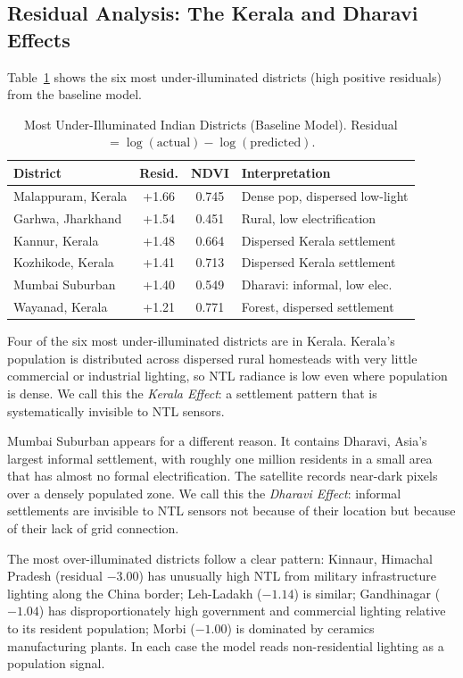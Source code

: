 \documentclass[conference]{IEEEtran}
\begin{document}
\subsection{Residual Analysis: The Kerala and Dharavi Effects}

Table~\ref{tab:residuals} shows the six most under-illuminated districts (high positive residuals) from the baseline model.

\begin{table}[!t]
\caption{Most Under-Illuminated Indian Districts (Baseline Model). Residual $= \log(\text{actual}) - \log(\text{predicted})$.}
\label{tab:residuals}
\centering
\renewcommand{\arraystretch}{1.2}
\begin{tabular}{lccp{2.8cm}}
\toprule
\textbf{District} & \textbf{Resid.} & \textbf{NDVI} & \textbf{Interpretation} \\
\midrule
Malappuram, Kerala  & +1.66 & 0.745 & Dense pop, dispersed low-light \\
Garhwa, Jharkhand   & +1.54 & 0.451 & Rural, low electrification \\
Kannur, Kerala      & +1.48 & 0.664 & Dispersed Kerala settlement \\
Kozhikode, Kerala   & +1.41 & 0.713 & Dispersed Kerala settlement \\
Mumbai Suburban     & +1.40 & 0.549 & Dharavi: informal, low elec. \\
Wayanad, Kerala     & +1.21 & 0.771 & Forest, dispersed settlement \\
\bottomrule
\end{tabular}
\end{table}

Four of the six most under-illuminated districts are in Kerala. Kerala's population is distributed across dispersed rural homesteads with very little commercial or industrial lighting, so NTL radiance is low even where population is dense. We call this the \textit{Kerala Effect}: a settlement pattern that is systematically invisible to NTL sensors.

Mumbai Suburban appears for a different reason. It contains Dharavi, Asia's largest informal settlement, with roughly one million residents in a small area that has almost no formal electrification. The satellite records near-dark pixels over a densely populated zone. We call this the \textit{Dharavi Effect}: informal settlements are invisible to NTL sensors not because of their location but because of their lack of grid connection.

The most over-illuminated districts follow a clear pattern: Kinnaur, Himachal Pradesh (residual $-3.00$) has unusually high NTL from military infrastructure lighting along the China border; Leh-Ladakh ($-1.14$) is similar; Gandhinagar ($-1.04$) has disproportionately high government and commercial lighting relative to its resident population; Morbi ($-1.00$) is dominated by ceramics manufacturing plants. In each case the model reads non-residential lighting as a population signal.
\end{document}
